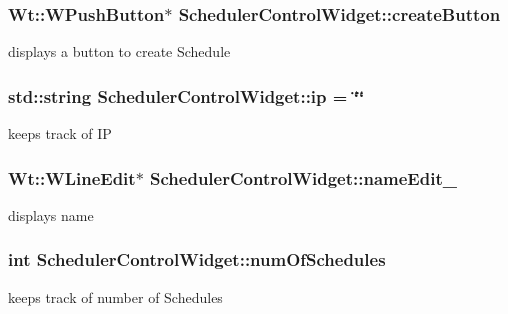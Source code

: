 \subsubsection[{\texorpdfstring{create\+Button}{createButton}}]{\setlength{\rightskip}{0pt plus 5cm}Wt\+::\+W\+Push\+Button$\ast$ Scheduler\+Control\+Widget\+::create\+Button\hspace{0.3cm}{\ttfamily [private]}}\hypertarget{classSchedulerControlWidget_ae2609c02e0649a2fc866746427e00967}{}\label{classSchedulerControlWidget_ae2609c02e0649a2fc866746427e00967}
displays a button to create Schedule 
\subsubsection[{\texorpdfstring{ip}{ip}}]{\setlength{\rightskip}{0pt plus 5cm}std\+::string Scheduler\+Control\+Widget\+::ip = \char`\"{}\char`\"{}\hspace{0.3cm}{\ttfamily [private]}}\hypertarget{classSchedulerControlWidget_a320557ef7428e36682b21d9ad3b877ba}{}\label{classSchedulerControlWidget_a320557ef7428e36682b21d9ad3b877ba}
keeps track of IP 
\subsubsection[{\texorpdfstring{name\+Edit\+\_\+}{nameEdit_}}]{\setlength{\rightskip}{0pt plus 5cm}Wt\+::\+W\+Line\+Edit$\ast$ Scheduler\+Control\+Widget\+::name\+Edit\+\_\+\hspace{0.3cm}{\ttfamily [private]}}\hypertarget{classSchedulerControlWidget_afb6d2313419723521e39ee1d778efc3c}{}\label{classSchedulerControlWidget_afb6d2313419723521e39ee1d778efc3c}
displays name 
\subsubsection[{\texorpdfstring{num\+Of\+Schedules}{numOfSchedules}}]{\setlength{\rightskip}{0pt plus 5cm}int Scheduler\+Control\+Widget\+::num\+Of\+Schedules\hspace{0.3cm}{\ttfamily [private]}}\hypertarget{classSchedulerControlWidget_a9743fedba173a1b29604e315d06d97fd}{}\label{classSchedulerControlWidget_a9743fedba173a1b29604e315d06d97fd}
keeps track of number of Schedules 
